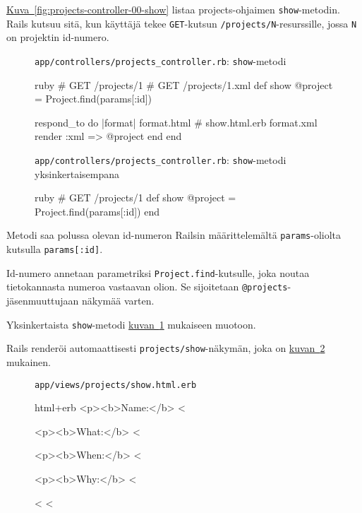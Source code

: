 \documentclass{article}
\newenvironment{myfigure}[1][tbp]{
  \begin{figure}[#1]
    \centering
    \begin{lrbox}{\myfigurebox}
      \begin{minipage}{\textwidth}
}{
      \end{minipage}
    \end{lrbox}
    \colorbox{blue!4}{\usebox{\myfigurebox}}
  \end{figure}
}
\newcommand{\myref}[2]{\hyperref[#2]{#1~\ref*{#2}}}
\begin{document}
\begin{samepage}
\myref{Kuva}{fig:projects-controller-00-show} listaa projects-ohjaimen
\texttt{show}-metodin. Rails kutsuu sitä, kun käyttäjä tekee
\texttt{GET}-kutsun \texttt{/projects/N}-resurssille, jossa \texttt{N} on
projektin id-numero.

\begin{myfigure}[H]
\caption{\texttt{app/controllers/projects\_controller.rb}:
\texttt{show}-metodi}
\label{fig:projects-controller-00-show}

\begin{pygmented}{ruby}
  # GET /projects/1
  # GET /projects/1.xml
  def show
    @project = Project.find(params[:id])

    respond_to do |format|
      format.html # show.html.erb
      format.xml  { render :xml => @project }
    end
  end
\end{pygmented}

\caption{\texttt{app/controllers/projects\_controller.rb}:
\texttt{show}-metodi yksinkertaisempana}
\label{fig:projects-controller-01-show}

\begin{pygmented}{ruby}
  # GET /projects/1
  def show
    @project = Project.find(params[:id])
  end
\end{pygmented}
\end{myfigure}
\end{samepage}

Metodi saa polussa olevan id-numeron Railsin määrittelemältä
\texttt{params}-oliolta kutsulla \texttt{params[:id]}.

Id-numero annetaan parametriksi \texttt{Project.find}-kutsulle, joka noutaa
tietokannasta numeroa vastaavan olion. Se sijoitetaan
\texttt{@projects}-jäsenmuuttujaan näkymää varten.

Yksinkertaista \texttt{show}-metodi
\myref{kuvan}{fig:projects-controller-01-show} mukaiseen muotoon.

\begin{samepage}
Rails renderöi automaattisesti \texttt{projects/show}-näkymän, joka on
\myref{kuvan}{fig:projects-show-view-00} mukainen.

\begin{myfigure}[H]
\caption{\texttt{app/views/projects/show.html.erb}}
\label{fig:projects-show-view-00}

\begin{pygmented}{html+erb}
<p><b>Name:</b> <%

<p><b>What:</b> <%

<p><b>When:</b> <%

<p><b>Why:</b> <%


<%
<%
\end{pygmented}
\end{myfigure}
\end{samepage}
\end{document}
